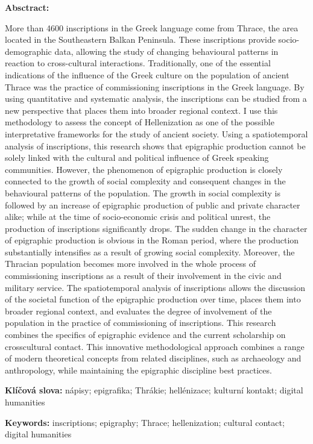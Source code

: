 {\bf Absctract:}

More than 4600 inscriptions in the Greek language come from Thrace, the area located in the Southeastern Balkan Peninsula. These inscriptions provide socio-demographic data, allowing the study of changing behavioural patterns in reaction to cross-cultural interactions. Traditionally, one of the essential indications of the influence of the Greek culture on the population of ancient Thrace was the practice of commissioning inscriptions in the Greek language. By using quantitative and systematic analysis, the inscriptions can be studied from a new perspective that places them into broader regional context. I use this methodology to assess the concept of Hellenization as one of the possible interpretative frameworks for the study of ancient society. Using a spatiotemporal analysis of inscriptions, this research shows that epigraphic production cannot be solely linked with the cultural and political influence of Greek speaking communities. However, the phenomenon of epigraphic production is closely connected to the growth of social complexity and consequent changes in the behavioural patterns of the population. The growth in social complexity is followed by an increase of epigraphic production of public and private character alike; while at the time of socio-economic crisis and political unrest, the production of inscriptions significantly drops. The sudden change in the character of epigraphic production is obvious in the Roman period, where the production substantially intensifies as a result of growing social complexity. Moreover, the Thracian population becomes more involved in the whole process of commissioning inscriptions as a result of their involvement in the civic and military service. The spatiotemporal analysis of inscriptions allows the discussion of the societal function of the epigraphic production over time, places them into broader regional context, and evaluates the degree of involvement of the population in the practice of commissioning of inscriptions. This research combines the specifics of epigraphic evidence and the current scholarship on crosscultural contact. This innovative methodological approach combines a range of modern theoretical concepts from related disciplines, such as archaeology and anthropology, while maintaining the epigraphic discipline best practices.

{\bf Klíčová slova:} nápisy; epigrafika; Thrákie; hellénizace; kulturní kontakt; digital humanities

{\bf Keywords:} inscriptions; epigraphy; Thrace; hellenization; cultural contact; digital humanities

